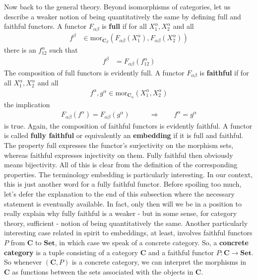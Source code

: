 Now back to the general theory.
Beyond isomorphisms of categories, let us describe a weaker notion of being quantitatively the same by defining full and faithful functors.
A functor $F_{\alpha\beta}$ is \textbf{full} if for all $X_{1}^{\alpha},X_{2}^{\alpha}$ and all
\begin{align*}
  f^{\beta}
  &\in
  \mathrm{mor}_{\mathbf{C}_{\beta}}
  (F_{\alpha\beta}(X_{1}^{\alpha}),F_{\alpha\beta}(X_{2}^{\alpha}))
\end{align*}
there is an $f_{12}^{\alpha}$ such that
\begin{align*}
  f^{\beta}
  &=
  F_{\alpha\beta}(f_{12}^{\alpha})
\end{align*}
The composition of full functors is evidently full.
A functor $F_{\alpha\beta}$ is \textbf{faithful} if for all $X_{1}^{\alpha},X_{2}^{\alpha}$ and all
\begin{align*}
  f^{\alpha},g^{\alpha}
  \in
  \mathrm{mor}_{\mathbf{C}_{\alpha}}(X_{1}^{\alpha},X_{2}^{\alpha})
\end{align*}
the implication
\begin{align*}
  F_{\alpha\beta}(f^{\alpha})
  =
  F_{\alpha\beta}(g^{\alpha})
  \qquad
  &\Rightarrow
  \qquad
  f^{\alpha}
  =
  g^{\alpha}
\end{align*}
is true.
Again, the composition of faithful functors is evidently faithful.
A functor is called \textbf{fully faithful} or equivalently an \textbf{embedding} if it is full and faithful.
The property full expresses the functor's surjectivity on the morphism sets, whereas faithful expresses injectivity on them.
Fully faithful then obviously means bijectivity.
All of this is clear from the definition of the corresponding properties.
The terminology embedding is particularly interesting.
In our context, this is just another word for a fully faithful functor.
Before spoiling too much, let's defer the explanation to the end of this subsection where the necessary statement is eventually available.
In fact, only then will we be in a position to really explain why fully faithful is a weaker - but in some sense, for category theory, sufficient - notion of being quantitatively the same.
Another particularly interesting case related in spirit to embeddings, at least, involves faithful functors $P$ from $\mathbf{C}$ to $\mathbf{Set}$, in which case we speak of a concrete category.
So, a \textbf{concrete category} is a tuple consisting of a category $\mathbf{C}$ and a faithful functor $P \colon \mathbf{C} \rightarrow \mathbf{Set}$.
So whenever $(\mathbf{C},P)$ is a concrete category, we can interpret the morphisms in $\mathbf{C}$ as functions between the sets associated with the objects in $\mathbf{C}$.
